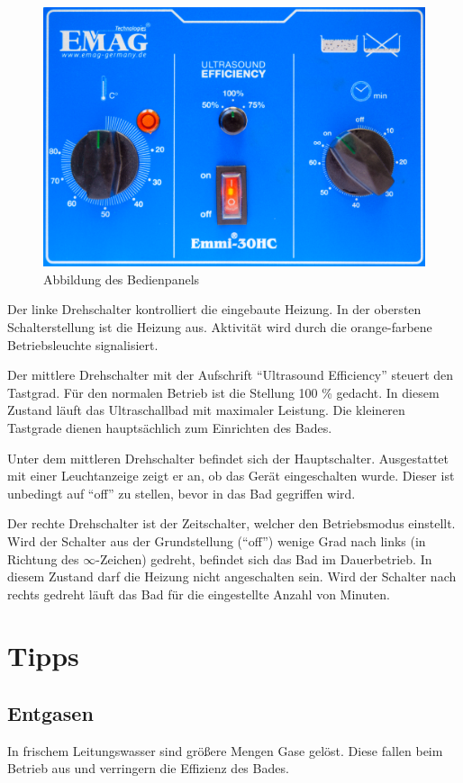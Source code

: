 \documentclass{\basedir/fablab-document}
\begin{document}
\begin{figure}
\centering
\includegraphics[width=0.6\linewidth]{img/frontpanel.png}
\caption[Abbildung des Bedienpanels]{Abbildung des Bedienpanels}
\end{figure}

Der linke Drehschalter kontrolliert die eingebaute Heizung.
In der obersten Schalterstellung ist die Heizung aus.
Aktivität wird durch die orange-farbene Betriebsleuchte signalisiert.

Der mittlere Drehschalter mit der Aufschrift \enquote{Ultrasound Efficiency} steuert den Tastgrad.
Für den normalen Betrieb ist die Stellung 100 \% gedacht.
In diesem Zustand läuft das Ultraschallbad mit maximaler Leistung.
Die kleineren Tastgrade dienen hauptsächlich zum Einrichten des Bades.

Unter dem mittleren Drehschalter befindet sich der Hauptschalter.
Ausgestattet mit einer Leuchtanzeige zeigt er an, ob das Gerät eingeschalten wurde.
Dieser ist unbedingt auf \enquote{off} zu stellen, bevor in das Bad gegriffen wird.

Der rechte Drehschalter ist der Zeitschalter, welcher den Betriebsmodus einstellt.
Wird der Schalter aus der Grundstellung (\enquote{off}) wenige Grad nach links (in Richtung des $\infty$-Zeichen) gedreht, befindet sich das Bad im Dauerbetrieb.
In diesem Zustand darf die Heizung nicht angeschalten sein.
Wird der Schalter nach rechts gedreht läuft das Bad für die eingestellte Anzahl von Minuten.


\section{Tipps}
\subsection{Entgasen}
In frischem Leitungswasser sind größere Mengen Gase gelöst.
Diese fallen beim Betrieb aus und verringern die Effizienz des Bades.
\end{document}
